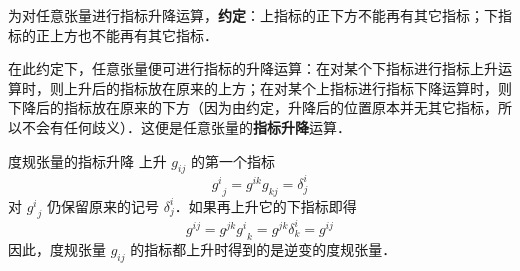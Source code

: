 为对任意张量进行指标升降运算，\textbf{约定}：上指标的正下方不能再有其它指标；下指标的正上方也不能再有其它指标．

在此约定下，任意张量便可进行指标的升降运算：在对某个下指标进行指标上升运算时，则上升后的指标放在原来的上方；在对某个上指标进行指标下降运算时，则下降后的指标放在原来的下方（因为由约定，升降后的位置原本并无其它指标，所以不会有任何歧义）．这便是任意张量的\textbf{指标升降}运算．

\begin{example}{度规张量的指标升降}
上升 $g_{ij}$ 的第一个指标
\begin{equation}
{g^{i}}_{j}=g^{ik} g_{kj}=\delta^i_j
\end{equation}
对 ${g^i}_j$ 仍保留原来的记号 $\delta^i_j$．如果再上升它的下指标即得
\begin{equation}
g^{ij}=g^{jk}{g^i}_k=g^{jk}\delta^i_k=g^{ij}
\end{equation}
因此，度规张量 $g_{ij}$ 的指标都上升时得到的是逆变的度规张量．
\end{example}